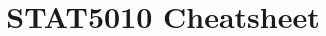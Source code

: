 \documentclass[a4paper, 10pt]{article}
\title{STAT5010 Cheatsheet}
\begin{document}
\footnotesize

\pagestyle{empty}
\setlength{\abovedisplayskip}{3pt}
\setlength{\belowdisplayskip}{2pt}

\begin{multicols*}{2}
    
\end{multicols*}
\end{document}
